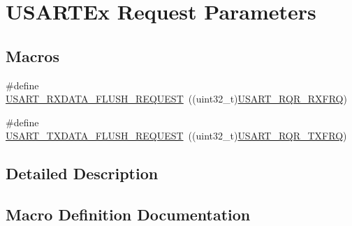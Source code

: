 \hypertarget{group___u_s_a_r_t___request___parameters}{}\section{U\+S\+A\+R\+T\+Ex Request Parameters}
\label{group___u_s_a_r_t___request___parameters}
\subsection*{Macros}
\begin{DoxyCompactItemize}
\item 
\#define \hyperlink{group___u_s_a_r_t___request___parameters_ga3d08169bc6516ef929b161f47ecba555}{U\+S\+A\+R\+T\+\_\+\+R\+X\+D\+A\+T\+A\+\_\+\+F\+L\+U\+S\+H\+\_\+\+R\+E\+Q\+U\+E\+ST}~((uint32\+\_\+t)\hyperlink{group___peripheral___registers___bits___definition_ga7b148ee7c697bbcf836648063613612a}{U\+S\+A\+R\+T\+\_\+\+R\+Q\+R\+\_\+\+R\+X\+F\+RQ})
\item 
\#define \hyperlink{group___u_s_a_r_t___request___parameters_ga5d3de7b3c6b8f2691dc6ddae10c2355d}{U\+S\+A\+R\+T\+\_\+\+T\+X\+D\+A\+T\+A\+\_\+\+F\+L\+U\+S\+H\+\_\+\+R\+E\+Q\+U\+E\+ST}~((uint32\+\_\+t)\hyperlink{group___peripheral___registers___bits___definition_gaa40d2e52b5955b30c9399eb3dec769e8}{U\+S\+A\+R\+T\+\_\+\+R\+Q\+R\+\_\+\+T\+X\+F\+RQ})
\end{DoxyCompactItemize}


\subsection{Detailed Description}


\subsection{Macro Definition Documentation}
\mbox{\label{group___u_s_a_r_t___request___parameters_ga3d08169bc6516ef929b161f47ecba555}} 
